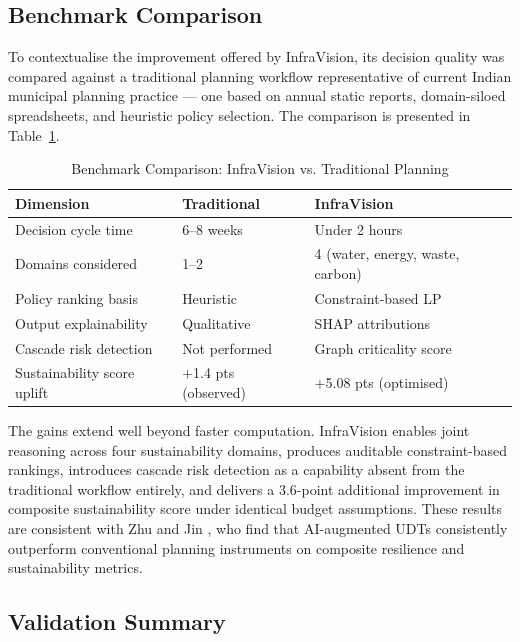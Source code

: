 \documentclass[conference]{IEEEtran}
\begin{document}
\subsection{Benchmark Comparison}

To contextualise the improvement offered by InfraVision, its decision
quality was compared against a traditional planning workflow
representative of current Indian municipal planning practice --- one
based on annual static reports, domain-siloed spreadsheets, and
heuristic policy selection. The comparison is presented in
Table~\ref{tab:benchmark}.

\begin{table}[htbp]
\caption{Benchmark Comparison: InfraVision vs. Traditional Planning}
\label{tab:benchmark}
\begin{center}
\begin{tabular}{|p{2.0cm}|p{2.0cm}|p{2.2cm}|}
\hline
\textbf{Dimension} & \textbf{Traditional} & \textbf{InfraVision} \\
\hline
Decision cycle time & 6--8 weeks & Under 2 hours \\
Domains considered & 1--2 & 4 (water, energy, waste, carbon) \\
Policy ranking basis & Heuristic & Constraint-based LP \\
Output explainability & Qualitative & SHAP attributions \\
Cascade risk detection & Not performed & Graph criticality score \\
Sustainability score uplift & $+$1.4 pts (observed) & $+$5.08 pts (optimised) \\
\hline
\end{tabular}
\end{center}
\end{table}

The gains extend well beyond faster computation. InfraVision enables
joint reasoning across four sustainability domains, produces auditable
constraint-based rankings, introduces cascade risk detection as a
capability absent from the traditional workflow entirely, and delivers a
3.6-point additional improvement in composite sustainability score under
identical budget assumptions. These results are consistent with
Zhu and Jin \cite{zhu2025}, who find that AI-augmented UDTs
consistently outperform conventional planning instruments on composite
resilience and sustainability metrics.

\subsection{Validation Summary}
\end{document}
